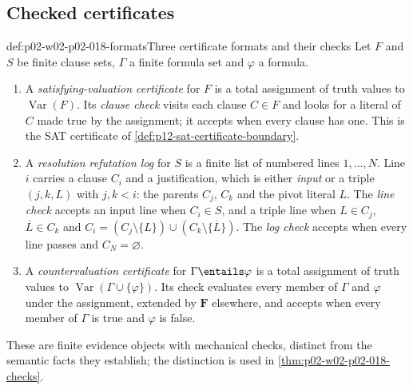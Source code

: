 \subsection{Checked certificates}
\label{sec:p02-w02-p02-018-certificates}

\begin{hbdefinition}{def:p02-w02-p02-018-formats}{Three certificate formats and their checks}
Let \(F\) and \(S\) be finite clause sets, \(\Gamma\) a finite formula set and
\(\varphi\) a formula.
\begin{enumerate}
\item A \emph{satisfying-valuation certificate} for \(F\) is a total
      assignment of truth values to \(\operatorname{Var}(F)\).  Its
      \emph{clause check} visits each clause \(C\in F\) and looks for a literal
      of \(C\) made true by the assignment; it accepts when every clause has
      one.  This is the SAT certificate of
      \cref{def:p12-sat-certificate-boundary}.
\item A \emph{resolution refutation log} for \(S\) is a finite list of
      numbered lines \(1,\ldots,N\).  Line \(i\) carries a clause \(C_i\)
      and a justification, which is either \emph{input} or a triple
      \((j,k,L)\) with \(j,k<i\): the parents \(C_j\), \(C_k\) and the
      pivot literal \(L\).  The \emph{line check} accepts an input line when
      \(C_i\in S\), and a triple line when \(L\in C_j\),
      \(\overline L\in C_k\) and
      \(C_i=(C_j\setminus\{L\})\cup(C_k\setminus\{\overline L\})\).  The
      \emph{log check} accepts when every line passes and \(C_N=\varnothing\).
\item A \emph{countervaluation certificate} for \(\Gamma\entails\varphi\) is
      a total assignment of truth values to
      \(\operatorname{Var}(\Gamma\cup\{\varphi\})\).  Its check evaluates every
      member of \(\Gamma\) and \(\varphi\) under the assignment, extended by
      \(\mathbf F\) elsewhere, and accepts when every member of \(\Gamma\) is
      true and \(\varphi\) is false.
\end{enumerate}
These are finite evidence objects with mechanical checks, distinct from the
semantic facts they establish; the distinction is used in
\cref{thm:p02-w02-p02-018-checks}.
\end{hbdefinition}

